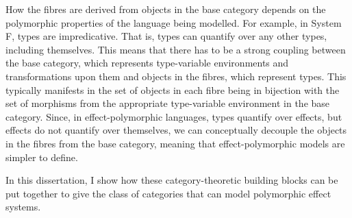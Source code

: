 \documentclass{Report}
\begin{document}
How the fibres are derived from objects in the base category depends on the polymorphic properties of the language being modelled. For example, in System F, types are impredicative. That is, types can quantify over any other types, including themselves. This means that there has to be a strong coupling between the base category, which represents type-variable environments and transformations upon them and objects in the fibres, which represent types. This typically manifests in the set of objects  in each fibre being in bijection with the set of morphisms from the appropriate type-variable environment in the base category. Since, in effect-polymorphic languages, types quantify over effects, but effects do not quantify over themselves, we can conceptually decouple the objects in the fibres from the base category, meaning that effect-polymorphic models are simpler to define. 

In this dissertation, I show how these category-theoretic building blocks can be put together to give the class of categories that can model polymorphic effect systems.
\end{document}
